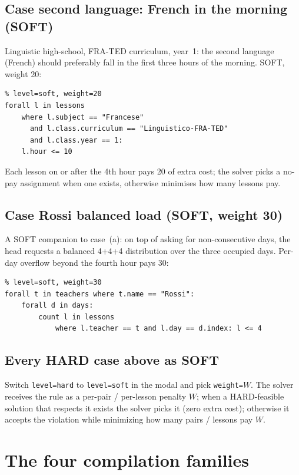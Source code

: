 \subsection{Case second language: French in the morning (SOFT)}

Linguistic high-school, FRA-TED curriculum, year~1: the second
language (French) should preferably fall in the first three
hours of the morning. SOFT, weight 20:

\begin{lstlisting}
% level=soft, weight=20
forall l in lessons
    where l.subject == "Francese"
      and l.class.curriculum == "Linguistico-FRA-TED"
      and l.class.year == 1:
    l.hour <= 10
\end{lstlisting}

Each lesson on or after the 4th hour pays 20 of extra cost; the
solver picks a no-pay assignment when one exists, otherwise
minimises how many lessons pay.

\subsection{Case Rossi balanced load (SOFT, weight 30)}

A SOFT companion to case~(a): on top of asking for
non-consecutive days, the head requests a balanced 4+4+4
distribution over the three occupied days. Per-day overflow
beyond the fourth hour pays 30:

\begin{lstlisting}
% level=soft, weight=30
forall t in teachers where t.name == "Rossi":
    forall d in days:
        count l in lessons
            where l.teacher == t and l.day == d.index: l <= 4
\end{lstlisting}

\subsection{Every HARD case above as SOFT}

Switch \texttt{level=hard} to \texttt{level=soft} in the modal
and pick \texttt{weight=$W$}. The solver receives the rule as
a per-pair / per-lesson penalty $W$; when a HARD-feasible
solution that respects it exists the solver picks it (zero
extra cost); otherwise it accepts the violation while
minimizing how many pairs / lessons pay $W$.

\section{The four compilation families}
\label{sec:dsl-families-en}

